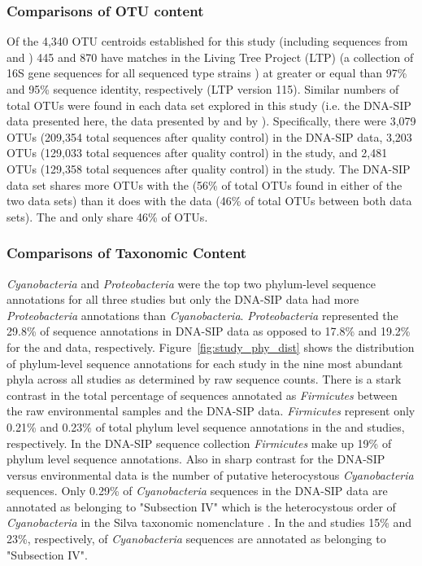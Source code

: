 \subsubsection{Comparisons of OTU content}
Of the 4,340 OTU centroids established for this study (including sequences from
\citet{Steven_2013} and \citet{Garcia_Pichel_2013}) 445 and 870 have matches in
the Living Tree Project (LTP) (a collection of 16S gene sequences for all
sequenced type strains \citep{Yarza_2008}) at greater or equal than 97\% and
95\% sequence identity, respectively (LTP version 115). Similar numbers of
total OTUs were found in each data set explored in this study (i.e. the DNA-SIP
data presented here, the data presented by \citet{Steven_2013} and by
\citet{Garcia_Pichel_2013}). Specifically, there were 3,079 OTUs (209,354 total
sequences after quality control) in the DNA-SIP data, 3,203 OTUs (129,033 total
sequences after quality control) in the \citet{Garcia_Pichel_2013} study, and
2,481 OTUs (129,358 total sequences after quality control) in the
\citet{Steven_2013} study. The DNA-SIP data set shares more OTUs with the
\citet{Steven_2013} (56\% of total OTUs found in either of the two data sets)
than it does with the \citet{Garcia_Pichel_2013} data (46\% of total OTUs
between both data sets). The \citet{Steven_2013} and \citet{Garcia_Pichel_2013}
only share 46\% of OTUs.

\subsubsection{Comparisons of Taxonomic Content} 
\textit{Cyanobacteria} and \textit{Proteobacteria} were the top two
phylum-level sequence annotations for all three studies but only the DNA-SIP
data had more \textit{Proteobacteria} annotations than \textit{Cyanobacteria}.
\textit{Proteobacteria} represented the 29.8\% of sequence annotations in
DNA-SIP data as opposed to 17.8\% and 19.2\% for the \citet{Garcia_Pichel_2013}
and \citet{Steven_2013} data, respectively. Figure~\ref{fig:study_phy_dist}
shows the distribution of phylum-level sequence annotations for each study in
the nine most abundant  phyla across all studies as determined by raw sequence
counts. There is a stark contrast in the total percentage of sequences
annotated as \textit{Firmicutes} between the raw environmental samples and the
DNA-SIP data. \textit{Firmicutes} represent only 0.21\% and 0.23\% of total
phylum level sequence annotations in the \citet{Steven_2013} and
\citet{Garcia_Pichel_2013} studies, respectively. In the DNA-SIP sequence
collection \textit{Firmicutes} make up 19\% of phylum level sequence
annotations. Also in sharp contrast for the DNA-SIP versus environmental data
is the number of putative heterocystous \textit{Cyanobacteria} sequences. Only
0.29\% of \textit{Cyanobacteria} sequences in the DNA-SIP data are annotated as
belonging to "Subsection IV" which is the heterocystous order of
\textit{Cyanobacteria} in the Silva taxonomic nomenclature \citep{17947321}. In
the \citet{Steven_2013} and \citet{Garcia_Pichel_2013} studies 15\% and 23\%,
respectively, of \textit{Cyanobacteria} sequences are annotated as belonging to
"Subsection IV".  

